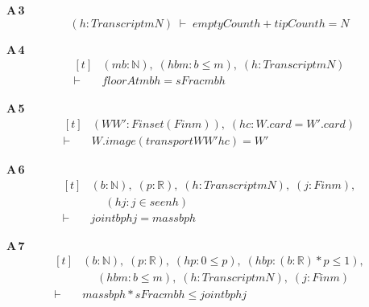 \noindent\textbf{A\,3}\quad{}
{\footnotesize\[ (\mathit{h} : \mathit{Transcript} \mathit{m} \mathit{N}) \;\vdash\; \mathit{emptyCount} \mathit{h} + \mathit{tipCount} \mathit{h} = \mathit{N} \]}

\noindent\textbf{A\,4}\quad{}
{\footnotesize\[ \begin{aligned}[t]
&(\mathit{m} \mathit{b} : \mathbb{N} ),\; (\mathit{hbm} : \mathit{b} \leq \mathit{m}),\; (\mathit{h} : \mathit{Transcript} \mathit{m} \mathit{N})\\
\vdash\;&\mathit{floorAt} \mathit{m} \mathit{b} \mathit{h} = \mathit{sFrac} \mathit{m} \mathit{b} \mathit{h}
\end{aligned} \]}

\noindent\textbf{A\,5}\quad{}
{\footnotesize\[ \begin{aligned}[t]
&(\mathit{W} \mathit{W'} : \mathit{Finset} (\mathit{Fin} \mathit{m})),\; (\mathit{hc} : \mathit{W}.\mathit{card} = \mathit{W'}.\mathit{card})\\
\vdash\;&\mathit{W}.\mathit{image} (\mathit{transport} \mathit{W} \mathit{W'} \mathit{hc}) = \mathit{W'}
\end{aligned} \]}

\noindent\textbf{A\,6}\quad{}
{\footnotesize\[ \begin{aligned}[t]
&(\mathit{b} : \mathbb{N} ),\; (\mathit{p} : \mathbb{R} ),\; (\mathit{h} : \mathit{Transcript} \mathit{m} \mathit{N}),\; (\mathit{j} : \mathit{Fin} \mathit{m}),\\
&\quad \; (\mathit{hj} : \mathit{j} \in \mathit{seen} \mathit{h})\\
\vdash\;&\mathit{joint} \mathit{b} \mathit{p} \mathit{h} \mathit{j} = \mathit{mass} \mathit{b} \mathit{p} \mathit{h}
\end{aligned} \]}

\noindent\textbf{A\,7}\quad{}
{\footnotesize\[ \begin{aligned}[t]
&(\mathit{b} : \mathbb{N} ),\; (\mathit{p} : \mathbb{R} ),\; (\mathit{hp} : 0 \leq \mathit{p}),\; (\mathit{hbp} : (\mathit{b} : \mathbb{R} ) * \mathit{p} \leq 1),\\
&\quad \; (\mathit{hbm} : \mathit{b} \leq \mathit{m}),\; (\mathit{h} : \mathit{Transcript} \mathit{m} \mathit{N}),\; (\mathit{j} : \mathit{Fin} \mathit{m})\\
\vdash\;&\mathit{mass} \mathit{b} \mathit{p} \mathit{h} * \mathit{sFrac} \mathit{m} \mathit{b} \mathit{h} \leq \mathit{joint} \mathit{b} \mathit{p} \mathit{h} \mathit{j}
\end{aligned} \]}

